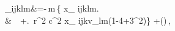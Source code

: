 _{ijklm}&=-\nu\,m\,\Delta \left\{ x_{\langle
  ijklm\rangle}\right.\nonumber
\\ &~~+\left. \,{r^2 \over c^2} x_{\langle
  ijk}v_{lm\rangle}\left(1-4\nu+3\nu^2\right)\right\}
+\left(\right)\label{I5}\,,\\
